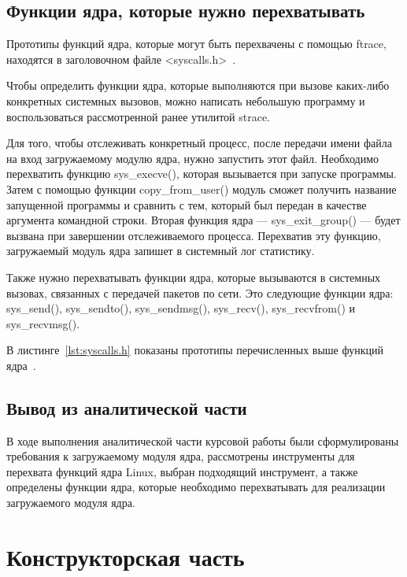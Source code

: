 \documentclass{bmstu}
\begin{document}
\section{Функции ядра, которые нужно перехватывать}

Прототипы функций ядра, которые могут быть перехвачены с помощью ftrace, находятся в заголовочном файле <syscalls.h>~\cite{Syscalls}.

Чтобы определить функции ядра, которые выполняются при вызове каких-либо конкретных системных вызовов, можно написать небольшую программу и воспользоваться рассмотренной ранее утилитой strace.

Для того, чтобы отслеживать конкретный процесс, после передачи имени файла на вход загружаемому модулю ядра, нужно запустить этот файл. 
Необходимо перехватить функцию sys\_execve(), которая вызывается при запуске программы. 
Затем с помощью функции copy\_from\_user() модуль сможет получить название запущенной программы и сравнить с тем, который был передан в качестве аргумента командной строки. 
Вторая функция ядра --- sys\_exit\_group() --- будет вызвана при завершении отслеживаемого процесса. 
Перехватив эту функцию, загружаемый модуль ядра запишет в системный лог статистику.

Также нужно перехватывать функции ядра, которые вызываются в системных вызовах, связанных с передачей пакетов по сети. 
Это следующие функции ядра: sys\_send(), sys\_sendto(), sys\_sendmsg(), sys\_recv(), sys\_recvfrom() и sys\_recvmsg().

В листинге~\ref{lst:syscalls.h} показаны прототипы перечисленных выше функций ядра~\cite{Syscalls}.


\section*{Вывод из аналитической части}

В ходе выполнения аналитической части курсовой работы были сформулированы требования к загружаемому модуля ядра, рассмотрены инструменты для перехвата функций ядра Linux, выбран подходящий инструмент, а также определены функции ядра, которые необходимо перехватывать для реализации загружаемого модуля ядра.

\chapter{Конструкторская часть}
\end{document}

